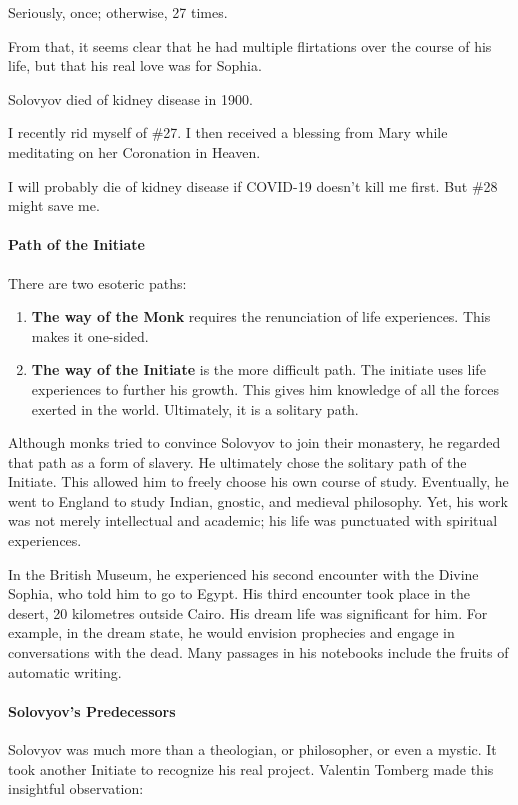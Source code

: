 \begin{quotex}
Seriously, once; otherwise, 27 times. 

\end{quotex}
From that, it seems clear that he had multiple flirtations over the course of his life, but that his real love was for Sophia.

Solovyov died of kidney disease in 1900.

I recently rid myself of \#27. I then received a blessing from Mary while meditating on her Coronation in Heaven.

I will probably die of kidney disease if COVID-19 doesn't kill me first. But \#28 might save me.

\paragraph{Path of the Initiate}
There are two esoteric paths:

\begin{enumerate}
\item \textbf{The way of the Monk} requires the renunciation of life experiences. This makes it one-sided. 
\item \textbf{The way of the Initiate} is the more difficult path. The initiate uses life experiences to further his growth. This gives him knowledge of all the forces exerted in the world. Ultimately, it is a solitary path. 
\end{enumerate}
Although monks tried to convince Solovyov to join their monastery, he regarded that path as a form of slavery. He ultimately chose the solitary path of the Initiate. This allowed him to freely choose his own course of study. Eventually, he went to England to study Indian, gnostic, and medieval philosophy. Yet, his work was not merely intellectual and academic; his life was punctuated with spiritual experiences.

In the British Museum, he experienced his second encounter with the Divine Sophia, who told him to go to Egypt. His third encounter took place in the desert, 20 kilometres outside Cairo. His dream life was significant for him. For example, in the dream state, he would envision prophecies and engage in conversations with the dead. Many passages in his notebooks include the fruits of automatic writing.

\paragraph{Solovyov's Predecessors}
Solovyov was much more than a theologian, or philosopher, or even a mystic. It took another Initiate to recognize his real project. Valentin Tomberg made this insightful observation:

